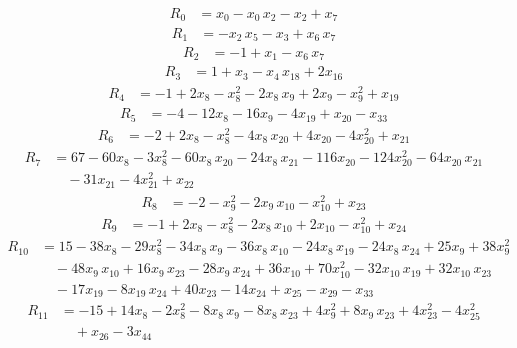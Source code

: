 \begin{align*}
R_{0} &= x_{0} -x_{0}\,x_{2} -x_{2} +x_{7}
\end{align*}
\begin{align*}
R_{1} &= -x_{2}\,x_{5} -x_{3} +x_{6}\,x_{7}
\end{align*}
\begin{align*}
R_{2} &= -1 +x_{1} -x_{6}\,x_{7}
\end{align*}
\begin{align*}
R_{3} &= 1 +x_{3} -x_{4}\,x_{18} +2x_{16}
\end{align*}
\begin{align*}
R_{4} &= -1 +2x_{8} -x_{8}^{2} -2x_{8}\,x_{9} +2x_{9} -x_{9}^{2} +x_{19}
\end{align*}
\begin{align*}
R_{5} &= -4 -12x_{8} -16x_{9} -4x_{19} +x_{20} -x_{33}
\end{align*}
\begin{align*}
R_{6} &= -2 +2x_{8} -x_{8}^{2} -4x_{8}\,x_{20} +4x_{20} -4x_{20}^{2} +x_{21}
\end{align*}
\begin{align*}
R_{7} &= 67 -60x_{8} -3x_{8}^{2} -60x_{8}\,x_{20} -24x_{8}\,x_{21} -116x_{20} -124x_{20}^{2} -64x_{20}\,x_{21} \\
&\quad {} -31x_{21} -4x_{21}^{2} +x_{22}
\end{align*}
\begin{align*}
R_{8} &= -2 -x_{9}^{2} -2x_{9}\,x_{10} -x_{10}^{2} +x_{23}
\end{align*}
\begin{align*}
R_{9} &= -1 +2x_{8} -x_{8}^{2} -2x_{8}\,x_{10} +2x_{10} -x_{10}^{2} +x_{24}
\end{align*}
\begin{align*}
R_{10} &= 15 -38x_{8} -29x_{8}^{2} -34x_{8}\,x_{9} -36x_{8}\,x_{10} -24x_{8}\,x_{19} -24x_{8}\,x_{24} +25x_{9} +38x_{9}^{2} \\
&\quad {} -48x_{9}\,x_{10} +16x_{9}\,x_{23} -28x_{9}\,x_{24} +36x_{10} +70x_{10}^{2} -32x_{10}\,x_{19} +32x_{10}\,x_{23} \\
&\quad {} -17x_{19} -8x_{19}\,x_{24} +40x_{23} -14x_{24} +x_{25} -x_{29} -x_{33}
\end{align*}
\begin{align*}
R_{11} &= -15 +14x_{8} -2x_{8}^{2} -8x_{8}\,x_{9} -8x_{8}\,x_{23} +4x_{9}^{2} +8x_{9}\,x_{23} +4x_{23}^{2} -4x_{25}^{2} \\
&\quad {} +x_{26} -3x_{44}
\end{align*}
